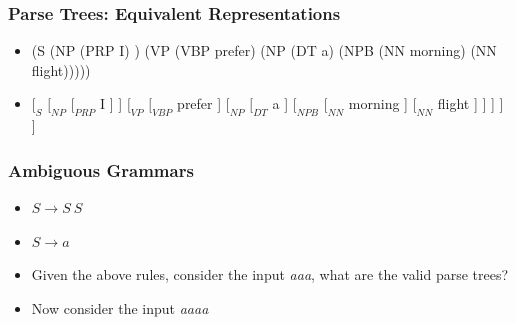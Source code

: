 \begin{frame}
\frametitle{Parse Trees: Equivalent Representations}
\begin{itemize}
\item (S (NP (PRP I) ) (VP (VBP prefer) (NP (DT a) (NPB (NN morning) (NN flight)))))
\item $[_{S}$ $[_{NP}$ $[_{PRP}$ I ] ] $[_{VP}$ $[_{VBP}$ prefer ]
$[_{NP}$ $[_{DT}$ a ] $[_{NPB}$ $[_{NN}$ morning ] $[_{NN}$ flight ] ] ] ] ]
\end{itemize}

\end{frame}

\begin{frame}
\frametitle{Ambiguous Grammars}
\begin{itemize}
\item $S \rightarrow S\ S$
\item $S \rightarrow a$
\item Given the above rules, consider the input {\em aaa}, what are the valid parse trees?
\item Now consider the input {\em aaaa}
\end{itemize}

\end{frame}


